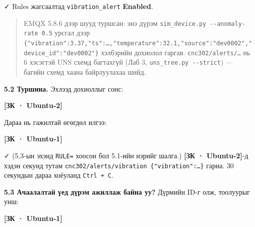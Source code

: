 ✓ Rules жагсаалтад \texttt{vibration\_alert} \textbf{Enabled}.

\begin{quote}
EMQX 5.8.6 дээр шууд туршсан: энэ дүрэм \texttt{sim\_\allowbreak{}device.\allowbreak{}py\ -\/\allowbreak{}-anomaly-rate\ 0.\allowbreak{}5} урсгал дээр \texttt{\{"vibration":\allowbreak{}3.\allowbreak{}37,"ts":\allowbreak{}\ldots{},"temperature":\allowbreak{}32.\allowbreak{}1,"source":\allowbreak{}"dev0002","device\_\allowbreak{}id":\allowbreak{}"dev0002"\}} хэлбэрийн дохиолол гаргав. \texttt{cnc302/\allowbreak{}alerts/\allowbreak{}\ldots{}} нь 6 хэсэгтэй UNS схемд багтахгүй (Лаб 3, \texttt{uns\_\allowbreak{}tree.\allowbreak{}py\ -\/\allowbreak{}-strict}) --- багийн схемд хаана байрлуулахаа шийд.
\end{quote}

\textbf{5.2 Туршина.} Эхлээд дохиоллыг сонс:

\textbf{{[}ЗК · Ubuntu-2{]}}

\begin{Shaded}
\begin{Highlighting}[]
\end{Highlighting}
\end{Shaded}

Дараа нь гажилтай өгөгдөл илгээ:

\textbf{{[}ЗК · Ubuntu-1{]}}

\begin{Shaded}
\begin{Highlighting}[]
\end{Highlighting}
\end{Shaded}

✓ (5.3-ын эхэнд \texttt{RULE=} хоосон бол 5.1-ийн нэрийг шалга.) \textbf{{[}ЗК · Ubuntu-2{]}}-д хэдэн секунд тутам \texttt{cnc302/\allowbreak{}alerts/\allowbreak{}vibration\ \{"vibration":\allowbreak{}\ldots{}\}} гарна. 30 секундын дараа хоёуланд \texttt{Ctrl\ +\ C}.

\textbf{5.3 Ачаалалтай үед дүрэм ажиллаж байна уу?} Дүрмийн ID-г олж, тоолуурыг унш:

\textbf{{[}ЗК · Ubuntu-1{]}}

